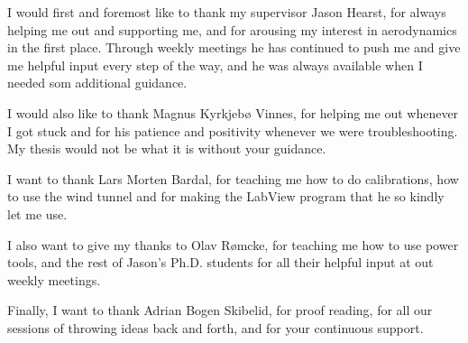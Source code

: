 I would first and foremost like to thank my supervisor Jason Hearst, for always helping me out and supporting me, and for arousing my interest in aerodynamics in the first place. Through weekly meetings he has continued to push me and give me helpful input every step of the way, and he was always available when I needed som additional guidance.  

I would also like to thank Magnus Kyrkjebø Vinnes, for helping me out whenever I got stuck and for his patience and positivity whenever we were troubleshooting. My thesis would not be what it is without your guidance. 

I want to thank Lars Morten Bardal, for teaching me how to do calibrations, how to use the wind tunnel and for making the LabView program that he so kindly let me use.  

I also want to give my thanks to Olav Rømcke, for teaching me how to use power tools, and the rest of Jason's Ph.D. students for all their helpful input at out weekly meetings.  

Finally, I want to thank Adrian Bogen Skibelid, for proof reading, for all our sessions of throwing ideas back and forth, and for your continuous support.   
